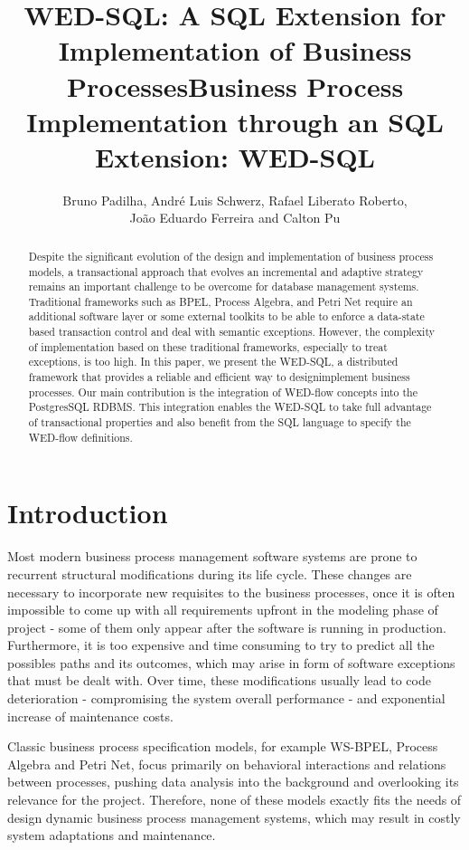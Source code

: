 \documentclass[12pt]{article}
\title{WED-SQL: A SQL Extension for Implementation of Business ProcessesBusiness Process Implementation through an SQL Extension: WED-SQL}
\author{Bruno Padilha\inst{1}, André Luis Schwerz\inst{2}, Rafael Liberato Roberto\inst{2},\\ João Eduardo Ferreira\inst{1} and Calton Pu\inst{3}}
\begin{document}
 

\maketitle

\begin{abstract}
Despite the significant evolution of the design and implementation of business process models, a transactional approach that evolves an incremental and adaptive strategy remains an important challenge to be overcome for database management systems. Traditional frameworks such as BPEL, Process Algebra, and Petri Net require an additional  software layer or some external toolkits to be able to enforce a data-state based transaction control and deal with semantic exceptions. However, the complexity of implementation based on these traditional frameworks, especially to treat exceptions, is too high. In this paper, we present the WED-SQL, a distributed framework that provides a reliable and efficient way to designimplement business processes. Our main contribution is the integration of WED-flow concepts into the PostgresSQL RDBMS. This integration enables the WED-SQL to take full advantage of  transactional properties and also benefit from the SQL language to specify the WED-flow definitions.
\end{abstract}
     
\section{Introduction}

Most  modern business process management software systems are prone  to recurrent structural modifications during its life cycle. These  changes are necessary to incorporate new requisites to the business processes, once it is often impossible  to come up with all requirements upfront in the modeling phase of project - some of them only appear after the software is running in production. Furthermore, it is too expensive and time consuming to try to predict all the possibles paths  and its outcomes, which may arise in form of software exceptions that must be dealt with. Over time, these modifications usually lead to code deterioration - compromising the system overall performance - and exponential increase of maintenance costs.

Classic business process specification models, for example WS-BPEL, Process Algebra and Petri Net, focus primarily on behavioral interactions and relations between processes, pushing data analysis into the background and overlooking its relevance for the project. Therefore, none of these models exactly fits the needs of design dynamic business process management systems, which may result in costly system adaptations and maintenance.
\end{document}
